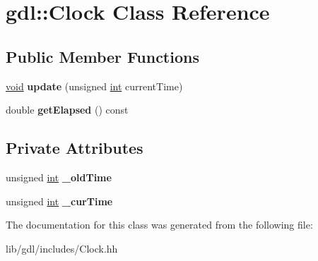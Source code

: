 \hypertarget{classgdl_1_1_clock}{}\section{gdl\+:\+:Clock Class Reference}
\label{classgdl_1_1_clock}
\subsection*{Public Member Functions}
\begin{DoxyCompactItemize}
\item 
\hypertarget{classgdl_1_1_clock_a1ec15565cb419cd67e6cdfedf6b112ca}{}\hyperlink{_s_d_l__audio_8h_a52835ae37c4bb905b903cbaf5d04b05f}{void} {\bfseries update} (unsigned \hyperlink{_s_d_l__thread_8h_a6a64f9be4433e4de6e2f2f548cf3c08e}{int} current\+Time)\label{classgdl_1_1_clock_a1ec15565cb419cd67e6cdfedf6b112ca}

\item 
\hypertarget{classgdl_1_1_clock_a8ea324bb269ca68e8f5a8c1cf071c3f7}{}double {\bfseries get\+Elapsed} () const \label{classgdl_1_1_clock_a8ea324bb269ca68e8f5a8c1cf071c3f7}

\end{DoxyCompactItemize}
\subsection*{Private Attributes}
\begin{DoxyCompactItemize}
\item 
\hypertarget{classgdl_1_1_clock_a4a8bc22ef6b697e47f7065db2bb6797f}{}unsigned \hyperlink{_s_d_l__thread_8h_a6a64f9be4433e4de6e2f2f548cf3c08e}{int} {\bfseries \+\_\+old\+Time}\label{classgdl_1_1_clock_a4a8bc22ef6b697e47f7065db2bb6797f}

\item 
\hypertarget{classgdl_1_1_clock_a6cca866f9dcfaabd8e0ac22660301398}{}unsigned \hyperlink{_s_d_l__thread_8h_a6a64f9be4433e4de6e2f2f548cf3c08e}{int} {\bfseries \+\_\+cur\+Time}\label{classgdl_1_1_clock_a6cca866f9dcfaabd8e0ac22660301398}

\end{DoxyCompactItemize}


The documentation for this class was generated from the following file\+:\begin{DoxyCompactItemize}
\item 
lib/gdl/includes/Clock.\+hh\end{DoxyCompactItemize}
